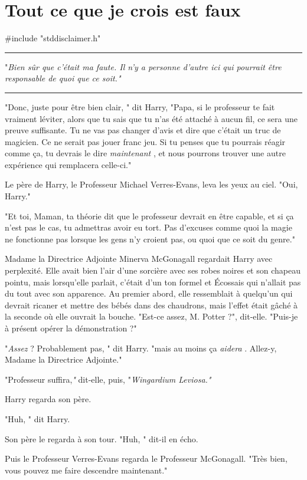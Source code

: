 
\chapter{Tout ce que je crois est faux}

\#include "stddisclaimer.h"
\par\noindent\rule{\textwidth}{0.4pt}
"\emph{Bien sûr que c'était ma faute. Il n'y a personne d'autre ici qui pourrait être responsable de quoi que ce soit."} 
\par\noindent\rule{\textwidth}{0.4pt}
"Donc, juste pour être bien clair, " dit Harry, "Papa, si le professeur te fait vraiment léviter, alors que tu sais que tu n'as été attaché à aucun fil, ce sera une preuve suffisante. Tu ne vas pas changer d'avis et dire que c'était un truc de magicien. Ce ne serait pas jouer franc jeu. Si tu penses que tu pourrais réagir comme ça, tu devrais le dire \emph{maintenant} , et nous pourrons trouver une autre expérience qui remplacera celle-ci."

Le père de Harry, le Professeur Michael Verres-Evans, leva les yeux au ciel. "Oui, Harry."

"Et toi, Maman, ta théorie dit que le professeur devrait en être capable, et si ça n'est pas le cas, tu admettras avoir eu tort. Pas d'excuses comme quoi la magie ne fonctionne pas lorsque les gens n'y croient pas, ou quoi que ce soit du genre."

Madame la Directrice Adjointe Minerva McGonagall regardait Harry avec perplexité. Elle avait bien l'air d'une sorcière avec ses robes noires et son chapeau pointu, mais lorsqu'elle parlait, c'était d'un ton formel et Écossais qui n'allait pas du tout avec son apparence. Au premier abord, elle ressemblait à quelqu'un qui devrait ricaner et mettre des bébés dans des chaudrons, mais l'effet était gâché à la seconde où elle ouvrait la bouche. "Est-ce assez, M. Potter ?", dit-elle. "Puis-je à présent opérer la démonstration ?"

"\emph{Assez}  ? Probablement pas, " dit Harry. "mais au moins ça \emph{aidera} . Allez-y, Madame la Directrice Adjointe."

"Professeur suffira,\emph{"}  dit-elle, puis, "\emph{Wingardium Leviosa."} 

Harry regarda son père.

"Huh, " dit Harry.

Son père le regarda à son tour. "Huh, " dit-il en écho.

Puis le Professeur Verres-Evans regarda le Professeur McGonagall. "Très bien, vous pouvez me faire descendre maintenant."

